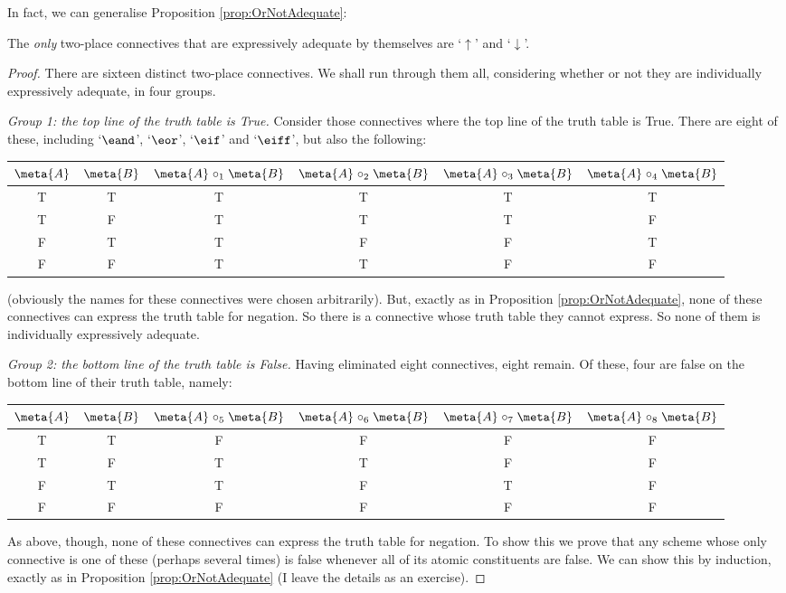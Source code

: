 In fact, we can generalise Proposition \ref{prop:OrNotAdequate}:
	\begin{thm}\label{thm:Ampheck}The \emph{only} two-place connectives that are expressively adequate by themselves are `$\uparrow$' and `$\downarrow$'. 
		\begin{proof}
			There are sixteen distinct two-place connectives. We shall run through them all, considering whether or not they are individually expressively adequate, in four groups. 
			
			\emph{Group 1: the top line of the truth table is True.} Consider those connectives where the top line of the truth table is True. There are eight of  these, including `$\eand$', `$\eor$', `$\eif$' and `$\eiff$', but also the following:
	\begin{center}
		\begin{tabular}{c c | c c c c}
		$\meta{A}$ & $\meta{B}$ & $\meta{A} \mathrel{\circ_1} \meta{B}$ & $\meta{A} \mathrel{\circ_2} \meta{B}$ & $\meta{A} \mathrel{\circ_3} \meta{B}$ & $\meta{A} \mathrel{\circ_4} \meta{B}$\\
		\hline
			 T & T & T & T & T & T \\
			 T & F & T & T & T & F\\
			 F & T & T & F &  F & T \\
			 F & F & T & T & F & F
	\end{tabular}
	\end{center}
	(obviously the names for these connectives were chosen arbitrarily). But, exactly as in Proposition \ref{prop:OrNotAdequate}, none of these connectives can express the truth table for negation. So there is a connective whose truth table they cannot express. So none of them is individually expressively adequate.
				
			\emph{Group 2: the bottom line of the truth table is False.} Having eliminated eight connectives, eight remain. Of these, four are false on the bottom line of their truth table, namely:
	\begin{center}
		\begin{tabular}{c c | c c c c}
		$\meta{A}$ & $\meta{B}$ & $\meta{A} \mathrel{\circ_5} \meta{B}$ & $\meta{A} \mathrel{\circ_6} \meta{B}$ & $\meta{A} \mathrel{\circ_7} \meta{B}$ & $\meta{A} \mathrel{\circ_8} \meta{B}$\\
		\hline
			 T & T & F & F & F & F \\
			 T & F & T & T & F & F\\
			 F & T & T & F &  T & F \\
			 F & F & F & F & F & F
	\end{tabular}
	\end{center}
	As above, though, none of these connectives can express the truth table for negation. To show this we prove that any scheme whose only connective is one of these (perhaps several times) is false whenever all of its atomic constituents are false. We can show this by induction, exactly as in Proposition \ref{prop:OrNotAdequate} (I leave the details as an exercise).
		

\end{proof}
\end{thm}
